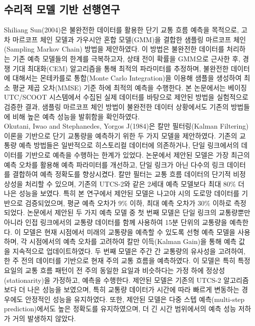 \documentclass[11pt]{report}
\begin{document}
\subsection{수리적 모델 기반 선행연구}
Shiliang Sun(2004)은 불완전한 데이터를 활용한 단기 교통 흐름 예측을 목적으로, 고차 마르코프 체인 모델과 가우시안 혼합 모델(GMM)을 결합한 샘플링 마르코프 체인(Sampling Markov Chain) 방법을 제안하였다. 
이 방법은 불완전한 데이터를 처리하는 기존 예측 모델들의 한계를 극복하고자, 상태 전이 확률을 GMM으로 근사한 후, 경쟁 기대 최대화(CEM) 알고리즘을 통해 최적의 파라미터를 추정하며, 불완전한 데이터에 대해서는 몬테카를로 통합(Monte Carlo Integration)을 이용해 샘플을 생성하여 최소 평균 제곱 오차(MMSE) 기준 하에 최적의 예측을 수행한다. 
본 논문에서는 베이징 UTC/SCOOT 시스템에서 수집된 실제 데이터를 바탕으로 제안된 방법을 실험적으로 검증한 결과, 샘플링 마르코프 체인 방법이 불완전한 데이터 상황에서도 기존의 방법들에 비해 높은 예측 성능을 발휘함을 확인하였다. \\
\indent Okutani, Iwao and Stephanedes, Yorgos J(1984)은 칼만 필터링(Kalman Filtering) 이론을 기반으로 단기 교통량을 예측하기 위한 두 가지 모델을 제안하였다. 
기존의 교통량 예측 방법들은 일반적으로 히스토리컬 데이터에 의존하거나, 단일 링크에서의 데이터를 기반으로 예측을 수행하는 한계가 있었다. 
논문에서 제안된 모델은 가장 최근의 예측 오차를 활용해 예측 파라미터를 개선하고, 단일 링크가 아닌 다수의 링크 데이터를 결합하여 예측 정확도를 향상시켰다. 
칼만 필터는 교통 흐름 데이터의 단기적 비정상성을 처리할 수 있으며, 기존의 UTCS-2와 같은 2세대 예측 모델보다 최대 80\% 더 나은 성능을 보였다. 
특히 본 연구에서 제안된 모델은 나고야 시의 도로망 데이터를 기반으로 검증되었으며, 평균 예측 오차가 9\% 이하, 최대 예측 오차가 30\% 이하로 측정되었다. 
논문에서 제안된 두 가지 예측 모델 중 첫 번째 모델은 단일 링크의 교통량뿐만 아니라 인접 링크에서의 교통량 데이터를 함께 사용하여 15분 단위의 교통량을 예측한다. 
이 모델은 현재 시점에서 미래의 교통량을 예측할 수 있도록 선형 예측 모델을 사용하며, 각 시점에서의 예측 오차를 고려하여 칼만 이득(Kalman Gain)을 통해 예측 값을 지속적으로 업데이트하였다. 
두 번째 모델은 주간 간 교통량의 유사성을 고려하여, 한 주 전의 데이터를 기반으로 현재 주의 교통 흐름을 예측하였다. 
이 모델은 특히 특정 요일의 교통 흐름 패턴이 전 주의 동일한 요일과 비슷하다는 가정 하에 정상성(stationarity)을 가정하고, 예측을 수행한다. 
제안된 모델은 기존의 UTCS-2 알고리즘보다 더 나은 성능을 보였으며, 특히 교통량 데이터가 시간에 따라 빠르게 변동하는 경우에도 안정적인 성능을 유지하였다. 
또한, 제안된 모델은 다중 스텝 예측(multi-step prediction)에서도 높은 정확도를 유지하였으며, 더 긴 시간 범위에서의 예측 성능 저하가 거의 발생하지 않았다.
\end{document}
